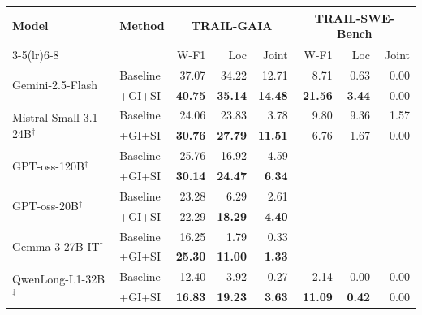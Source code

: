 \begin{table}[t]
\centering
\small
\setlength{\tabcolsep}{5pt}
\renewcommand{\arraystretch}{1.2}
\begin{tabular}{l l rrr @{\hspace{10pt}} rrr}
\toprule
\multirow{2}{*}{\textbf{Model}} &
\multirow{2}{*}{\textbf{Method}} &
\multicolumn{3}{c}{\textbf{TRAIL-GAIA}} &
\multicolumn{3}{c}{\textbf{TRAIL-SWE-Bench}} \\
\cmidrule(lr){3-5}\cmidrule(lr){6-8}
& & W-F1 & Loc & Joint & W-F1 & Loc & Joint \\
\midrule
\multirow{2}{*}{Gemini-2.5-Flash}
  & Baseline  & 37.07 & 34.22 & 12.71 &  8.71 &  0.63 & 0.00 \\
  & +GI+SI    & \textbf{40.75} & \textbf{35.14} & \textbf{14.48} &
               \textbf{21.56} & \textbf{3.44} & 0.00 \\[3pt]
\multirow{2}{*}{Mistral-Small-3.1-24B$^{\dagger}$}
  & Baseline  & 24.06 & 23.83 &  3.78 &
               9.80 &  9.36 &  1.57 \\
  & +GI+SI    & \textbf{30.76} & \textbf{27.79} & \textbf{11.51} &
               6.76 &  1.67 &  0.00 \\[3pt]
\multirow{2}{*}{GPT-oss-120B$^{\dagger}$}
  & Baseline  & 25.76 & 16.92 &  4.59 &
               \text{---} & \text{---} & \text{---} \\
  & +GI+SI    & \textbf{30.14} & \textbf{24.47} & \textbf{6.34} &
               \text{---} & \text{---} & \text{---} \\[3pt]
\multirow{2}{*}{GPT-oss-20B$^{\dagger}$}
  & Baseline  & 23.28 &  6.29 &  2.61 &
               \text{---} & \text{---} & \text{---} \\
  & +GI+SI    & 22.29 & \textbf{18.29} & \textbf{4.40} &
               \text{---} & \text{---} & \text{---} \\[3pt]
\multirow{2}{*}{Gemma-3-27B-IT$^{\dagger}$}
  & Baseline  & 16.25 &  1.79 &  0.33 &
               \text{---} & \text{---} & \text{---} \\
  & +GI+SI    & \textbf{25.30} & \textbf{11.00} & \textbf{1.33} &
               \text{---} & \text{---} & \text{---} \\[3pt]
\multirow{2}{*}{QwenLong-L1-32B$^{\ddagger}$}
  & Baseline  & 12.40 &  3.92 &  0.27 &
               2.14 &  0.00 &  0.00 \\
  & +GI+SI    & \textbf{16.83} & \textbf{19.23} & \textbf{3.63} &
               \textbf{11.09} & \textbf{0.42} & 0.00 \\
\bottomrule
\end{tabular}

\end{table}
